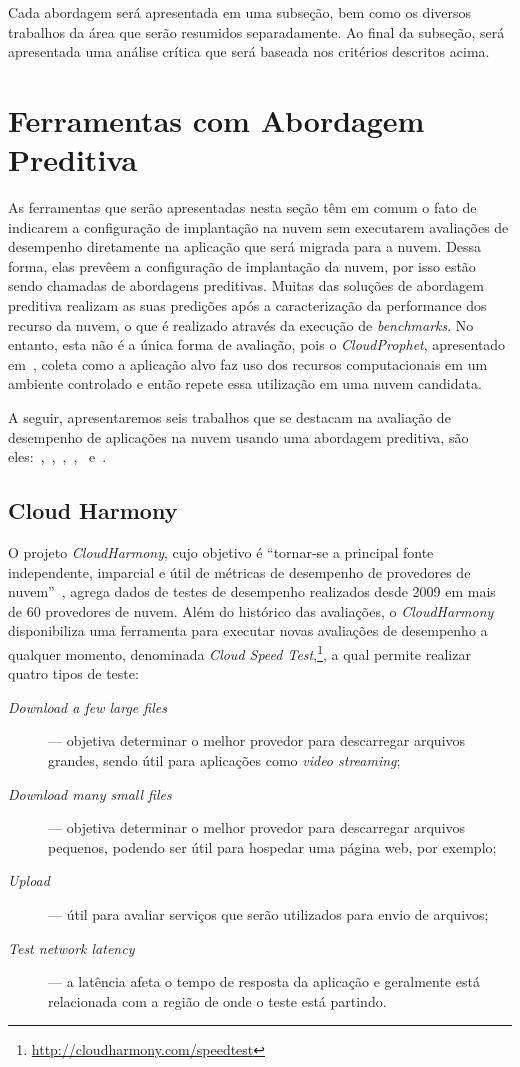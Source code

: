 Cada abordagem será apresentada em uma subseção, bem como os diversos trabalhos da área que serão resumidos separadamente. Ao final da subseção, será apresentada uma análise crítica que será baseada nos critérios descritos acima.

\section{Ferramentas com Abordagem Preditiva}
As ferramentas que serão apresentadas nesta seção têm em comum o fato de
indicarem a configuração de implantação na nuvem sem executarem avaliações de
desempenho diretamente na aplicação que será migrada para a nuvem. Dessa forma,
elas prevêem a configuração de implantação da nuvem, por isso estão sendo chamadas de
abordagens preditivas. Muitas das soluções de abordagem preditiva realizam as
suas predições após a caracterização da performance dos recurso da nuvem, o que
é realizado através da execução de \textit{benchmarks}. No entanto, esta não é a
única forma de avaliação, pois o \textit{CloudProphet}, apresentado
em~\cite{li2011cloudprophet}, coleta como a aplicação alvo faz uso dos recursos
computacionais em um ambiente controlado e então repete essa utilização em uma
nuvem candidata.

A seguir, apresentaremos seis trabalhos que se destacam na avaliação de
desempenho de aplicações na nuvem usando uma abordagem preditiva, são
eles:~\cite{cloudharmony},~\cite{malkowski2010cloudxplor},~\cite{li2011},~\cite{jung2013cloudadvisor},~\cite{fittkau2012cdosim}
e~\cite{li2011cloudprophet}.

\subsection{Cloud Harmony}
O projeto {\em CloudHarmony}, cujo
objetivo é ``tornar-se a principal fonte independente, imparcial e útil de
métricas de desempenho de provedores de nuvem''~\cite{cloudharmony}, agrega
dados de testes de desempenho realizados desde 2009 em mais de 60 provedores de
nuvem. Além do histórico das avaliações, o {\em CloudHarmony} disponibiliza uma ferramenta para executar novas avaliações de desempenho a qualquer momento, denominada
\textit{Cloud Speed Test},\footnote{\url{http://cloudharmony.com/speedtest}}, a qual permite realizar quatro tipos de teste:

\begin{description}
  \item[\em Download a few large files] --- objetiva determinar o melhor provedor
  para descarregar arquivos grandes, sendo útil para aplicações como {\em video
  streaming};
  \item[\em Download many small files] --- objetiva determinar o melhor provedor
  para descarregar arquivos pequenos, podendo ser útil para hospedar uma página
  web, por exemplo;
  \item[\em Upload] --- útil para avaliar serviços que serão utilizados para
  envio de arquivos;
  \item[\em Test network latency] --- a latência afeta o tempo de resposta da
  aplicação e geralmente está relacionada com a região de onde o teste está
  partindo.
\end{description}

